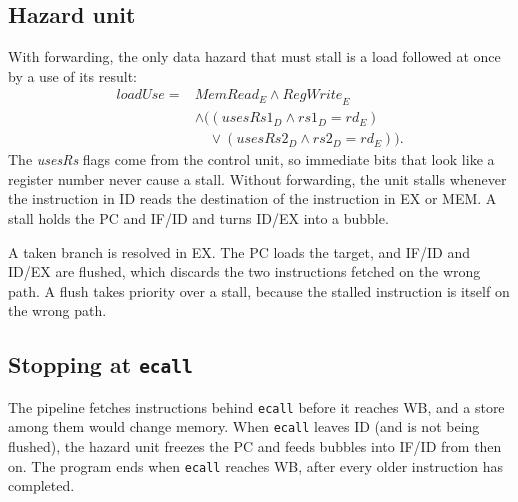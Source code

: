 \subsection{Hazard unit}
With forwarding, the only data hazard that must stall is a load followed
at once by a use of its result:
\begin{align*}
\mathit{loadUse} = {} & \mathit{MemRead}_{E} \wedge \mathit{RegWrite}_{E} \\
& \wedge \big( (\mathit{usesRs1}_{D} \wedge rs1_{D} = rd_{E}) \\
& \quad \vee (\mathit{usesRs2}_{D} \wedge rs2_{D} = rd_{E}) \big).
\end{align*}
The \textit{usesRs} flags come from the control unit, so immediate bits that
look like a register number never cause a stall. Without forwarding, the unit stalls whenever the
instruction in ID reads the destination of the instruction in EX or MEM.
A stall holds the PC and IF/ID and turns ID/EX into a bubble.

A taken branch is resolved in EX. The PC loads the target, and IF/ID and
ID/EX are flushed, which discards the two instructions fetched on the wrong
path. A flush takes priority over a stall, because the stalled instruction
is itself on the wrong path.

\subsection{Stopping at \texttt{ecall}}
The pipeline fetches instructions behind \texttt{ecall} before it reaches
WB, and a store among them would change memory. When \texttt{ecall} leaves
ID (and is not being flushed), the hazard unit freezes the PC and feeds
bubbles into IF/ID from then on. The program ends when \texttt{ecall}
reaches WB, after every older instruction has completed.
